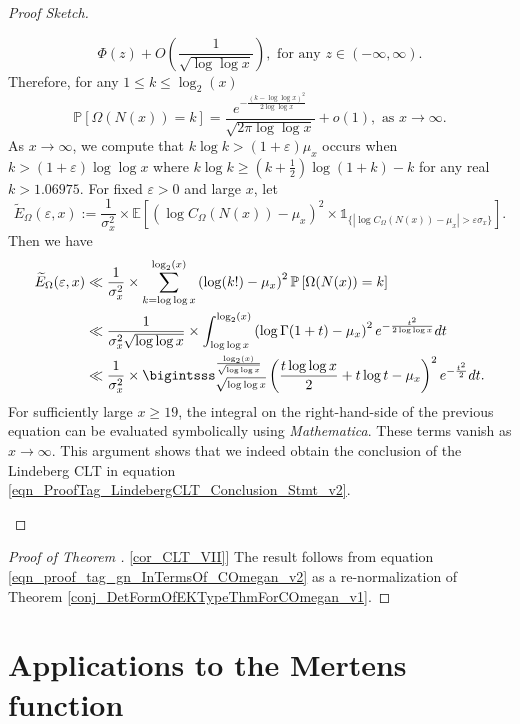 \documentclass[11pt,reqno,a4letter]{article}
\newcommand{\hlocalref}[1]{\hyperref[#1]{\ref{#1}}}
\numberwithin{equation}{section}
\numberwithin{figure}{section}
\numberwithin{table}{section}
\theoremstyle{plain}
\numberwithin{theorem}{section}
\theoremstyle{definition}
\begin{document}
\begin{proof}[Proof Sketch]
\begin{itemize}[noitemsep,topsep=0pt,leftmargin=0.23in]
\[     \Phi(z) + O\left(\frac{1}{\sqrt{\log\log x}}\right), \text{ for any } z \in (-\infty, \infty). 
\]
Therefore, for any $1 \leq k \leq \log_2(x)$ 
\[
\mathbb{P}\left[\Omega(N(x)) = k\right] = 
	\frac{e^{-\frac{(k-\log\log x)^2}{2\log\log x}}}{\sqrt{2\pi \log\log x}} + o(1), 
	\text{ as } x \rightarrow \infty. 
\]
As $x \rightarrow \infty$, we compute that $k\log k > (1+\varepsilon) \mu_x$ occurs when 
$k > (1+\varepsilon) \log\log x$ where 
$k\log k \geq \left(k + \frac{1}{2}\right) \log(1+k) - k$ for any real $k > 1.06975$. 
For fixed $\varepsilon > 0$ and large $x$, let 
\[
\widetilde{E}_{\Omega}(\varepsilon, x) := \frac{1}{\sigma_x^2} \times 
     \mathbb{E}\left[\left(\log C_{\Omega}(N(x)) - \mu_x\right)^2 
     \times 
     \mathds{1}_{\{\left\lvert \log C_{\Omega}(N(x)) - \mu_x \right\rvert > 
     \varepsilon \sigma_x\}}\right]. 
\]
Then we have 
\begin{align*}
\widetilde{E}_{\Omega}(\varepsilon, x) & \ll 
     \frac{1}{\sigma_x^2} \times 
     \sum_{k=\log\log x}^{\log_2(x)} \left(\log(k!) - \mu_x\right)^2 
     \mathbb{P}\left[\Omega(N(x)) = k\right] \\ 
     & \ll 
     \frac{1}{\sigma_x^2 \sqrt{\log\log x}} \times \int_{\log\log x}^{\log_2(x)} 
     \left(\log \Gamma(1+t) - \mu_x\right)^2 e^{-\frac{t^2}{2\log\log x}} dt \\ 
     & \ll 
     \frac{1}{\sigma_x^2} \times 
     \bigintsss_{\sqrt{\log\log x}}^{\frac{\log_2(x)}{\sqrt{\log\log x}}}
     \left(\frac{t \log\log x}{2} + t\log t - \mu_x\right)^2 
     e^{-\frac{t^2}{2}} dt. 
\end{align*} 
For sufficiently large $x \geq 19$, the integral on the 
right-hand-side of the previous equation can be evaluated 
symbolically using \emph{Mathematica}. 
These terms vanish as $x \rightarrow \infty$. 
This argument shows that we indeed obtain the conclusion of the Lindeberg CLT in 
equation \eqref{eqn_ProofTag_LindebergCLT_Conclusion_Stmt_v2}. 
\qedhere
\end{itemize}
\end{proof}

\begin{proof}[Proof of Theorem \hlocalref{cor_CLT_VII}]
The result follows from equation \eqref{eqn_proof_tag_gn_InTermsOf_COmegan_v2} 
as a re-normalization of Theorem \hlocalref{conj_DetFormOfEKTypeThmForCOmegan_v1}. 
\end{proof} 

\section{Applications to the Mertens function} 
\label{Section_KeyApplications} 
\label{Section_KeyApplications_NewExactFormulasForMx_FullSectionLabel} 
\end{document}
